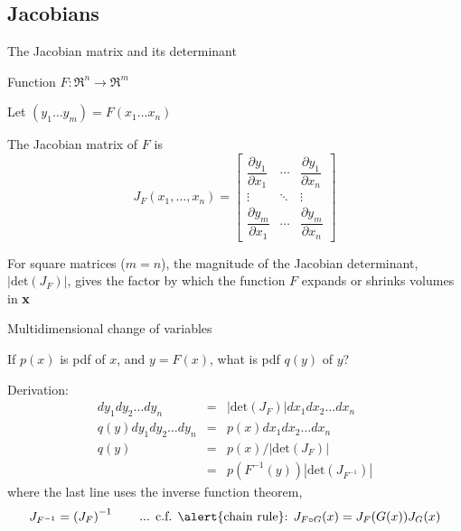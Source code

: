 \documentclass{beamer}
\begin{document}
\subsection{Jacobians}

\begin{frame}{The Jacobian matrix and its determinant}

\itemb
\item Function $F:\Re^n \to \Re^m$
\item Let $(y_1 \ldots y_m) = F(x_1 \ldots x_n)$
\item The \alert{Jacobian matrix} of $F$ is
\[
J_F(x_1,\ldots,x_n) =
\begin{bmatrix} \dfrac{\partial y_1}{\partial x_1} & \cdots & \dfrac{\partial y_1}{\partial x_n} \\ \vdots & \ddots & \vdots \\ \dfrac{\partial y_m}{\partial x_1} & \cdots & \dfrac{\partial y_m}{\partial x_n}  \end{bmatrix}
\]
\item For square matrices ($m=n$), the magnitude of the \alert{Jacobian determinant}, $|\mbox{det}(J_F)|$, gives the factor by which the function $F$ expands or shrinks volumes in ${\bf x}$
\iteme

\end{frame}

\begin{frame}{Multidimensional change of variables}

\itemb
 \item If $p(x)$ is pdf of $x$, and $y=F(x)$, what is pdf $q(y)$ of $y$?
 \item Derivation:
\begin{eqnarray*}
dy_1 dy_2 \ldots dy_n & = & \left|\mbox{det}\left(J_F\right)\right| dx_1 dx_2 \ldots dx_n \\
q(y) dy_1 dy_2 \ldots dy_n & = & p(x) dx_1 dx_2 \ldots dx_n \\
q(y) & = & p(x) / \left|\mbox{det}\left(J_F\right)\right| \\
& = & p(F^{-1}(y)) \left|\mbox{det}\left(J_{F^{-1}}\right)\right|
\end{eqnarray*}
where the last line uses the \alert{inverse function theorem},
\[
J_{F^{-1}} = \left( J_F \right)^{-1}
 \quad \quad \mbox{... c.f. \alert{chain rule}: $J_{F \circ G}(x) = J_F(G(x)) J_G(x)$}
\]
\iteme

\end{frame}
\end{document}
